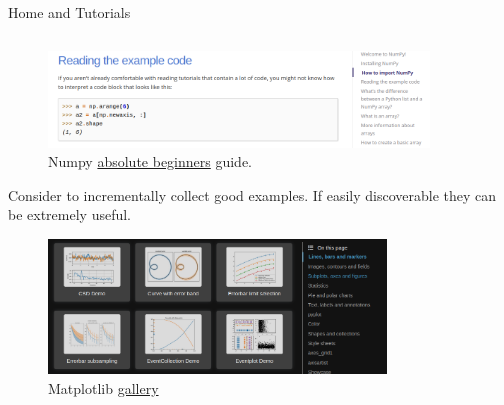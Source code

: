 \documentclass[9pt]{beamer}
\begin{document}
\begin{frame}{Home and Tutorials}
\begin{columns}
\begin{column}{0.5\textwidth}
            \begin{figure}
                \centering
                \includegraphics[width=0.9\textwidth]{numpy-abs-beginners}
                \caption{
                    Numpy
                    \href{https://numpy.org/doc/stable/user/absolute_beginners.html}{absolute
                    beginners} guide.
                }
            \end{figure}

            Consider to incrementally collect good examples. If easily
            discoverable they can be extremely useful.
            \vspace*{5pt}

            \begin{figure}
                \centering
                \includegraphics[width=0.8\textwidth]{matplotlib-gallery}
                \caption{
                    Matplotlib
                    \href{https://matplotlib.org/stable/gallery/}{gallery}
                }
            \end{figure}
        \end{column}
    \end{columns}
\end{frame}
\end{document}
